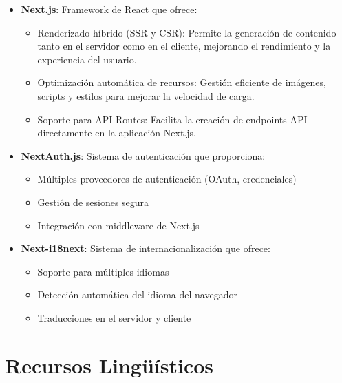 \begin{itemize}
	\item \textbf{Next.js}: Framework de React que ofrece:
	      \begin{itemize}
		      \item Renderizado híbrido (SSR y CSR): Permite la generación de contenido tanto en el servidor como en el cliente, mejorando el rendimiento y la experiencia del usuario.
		      \item Optimización automática de recursos: Gestión eficiente de imágenes, scripts y estilos para mejorar la velocidad de carga.
		      \item Soporte para API Routes: Facilita la creación de endpoints API directamente en la aplicación Next.js.
	      \end{itemize}


	\item \textbf{NextAuth.js}: Sistema de autenticación que proporciona:
	      \begin{itemize}
		      \item Múltiples proveedores de autenticación (OAuth, credenciales)
		      \item Gestión de sesiones segura
		      \item Integración con middleware de Next.js
	      \end{itemize}


	\item \textbf{Next-i18next}: Sistema de internacionalización que ofrece:
	      \begin{itemize}
		      \item Soporte para múltiples idiomas
		      \item Detección automática del idioma del navegador
		      \item Traducciones en el servidor y cliente
	      \end{itemize}
\end{itemize}

\section{Recursos Lingüísticos}


